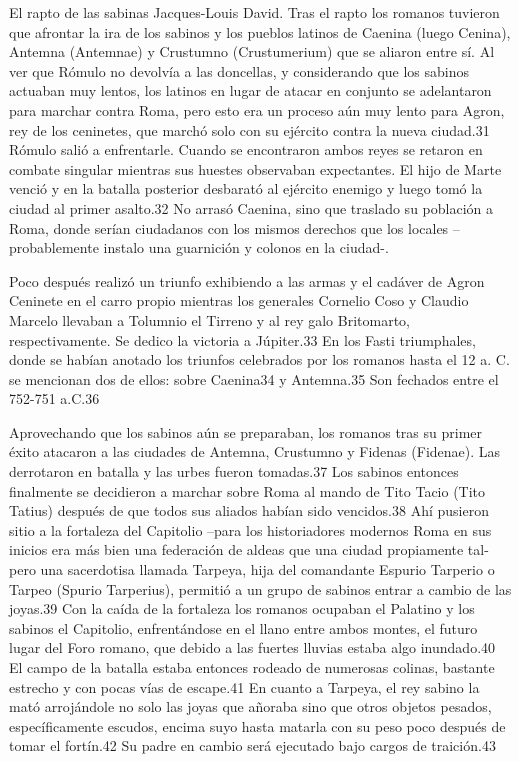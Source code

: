 \documentclass[11pt,a4paper]{book}
\begin{document}
	\bigskip
							
	\bigskip
							El rapto de las sabinas
	\bigskip
							Jacques-Louis David.
	\bigskip
							Tras el rapto los romanos tuvieron que afrontar la ira de los sabinos y los pueblos latinos de Caenina (luego Cenina), Antemna (Antemnae) y Crustumno (Crustumerium) que se aliaron entre sí. Al ver que Rómulo no devolvía a las doncellas, y considerando que los sabinos actuaban muy lentos, los latinos en lugar de atacar en conjunto se adelantaron para marchar contra Roma, pero esto era un proceso aún muy lento para Agron, rey de los ceninetes, que marchó solo con su ejército contra la nueva ciudad.31 Rómulo salió a enfrentarle. Cuando se encontraron ambos reyes se retaron en combate singular mientras sus huestes observaban expectantes. El hijo de Marte venció y en la batalla posterior desbarató al ejército enemigo y luego tomó la ciudad al primer asalto.32 No arrasó Caenina, sino que traslado su población a Roma, donde serían ciudadanos con los mismos derechos que los locales –probablemente instalo una guarnición y colonos en la ciudad-.
	\bigskip
							
	\bigskip
							Poco después realizó un triunfo exhibiendo a las armas y el cadáver de Agron Ceninete en el carro propio mientras los generales Cornelio Coso y Claudio Marcelo llevaban a Tolumnio el Tirreno y al rey galo Britomarto, respectivamente. Se dedico la victoria a Júpiter.33 En los Fasti triumphales, donde se habían anotado los triunfos celebrados por los romanos hasta el 12 a. C. se mencionan dos de ellos: sobre Caenina34 y Antemna.35 Son fechados entre el 752-751 a.C.36
	\bigskip
							
	\bigskip
							Aprovechando que los sabinos aún se preparaban, los romanos tras su primer éxito atacaron a las ciudades de Antemna, Crustumno y Fidenas (Fidenae). Las derrotaron en batalla y las urbes fueron tomadas.37 Los sabinos entonces finalmente se decidieron a marchar sobre Roma al mando de Tito Tacio (Tito Tatius) después de que todos sus aliados habían sido vencidos.38 Ahí pusieron sitio a la fortaleza del Capitolio –para los historiadores modernos Roma en sus inicios era más bien una federación de aldeas que una ciudad propiamente tal- pero una sacerdotisa llamada Tarpeya, hija del comandante Espurio Tarperio o Tarpeo (Spurio Tarperius), permitió a un grupo de sabinos entrar a cambio de las joyas.39 Con la caída de la fortaleza los romanos ocupaban el Palatino y los sabinos el Capitolio, enfrentándose en el llano entre ambos montes, el futuro lugar del Foro romano, que debido a las fuertes lluvias estaba algo inundado.40 El campo de la batalla estaba entonces rodeado de numerosas colinas, bastante estrecho y con pocas vías de escape.41 En cuanto a Tarpeya, el rey sabino la mató arrojándole no solo las joyas que añoraba sino que otros objetos pesados, específicamente escudos, encima suyo hasta matarla con su peso poco después de tomar el fortín.42 Su padre en cambio será ejecutado bajo cargos de traición.43
	\bigskip
							
\end{document}
